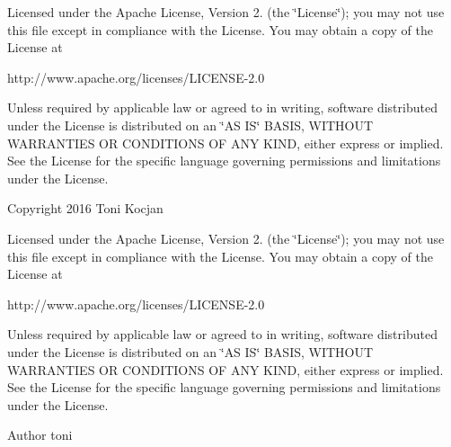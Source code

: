 Licensed under the Apache License, Version 2. (the \char`\"{}\+License\char`\"{}); you may not use this file except in compliance with the License. You may obtain a copy of the License at \begin{DoxyVerb}http://www.apache.org/licenses/LICENSE-2.0
\end{DoxyVerb}


Unless required by applicable law or agreed to in writing, software distributed under the License is distributed on an \char`\"{}\+A\+S I\+S\char`\"{} B\+A\+S\+IS, W\+I\+T\+H\+O\+UT W\+A\+R\+R\+A\+N\+T\+I\+ES OR C\+O\+N\+D\+I\+T\+I\+O\+NS OF A\+NY K\+I\+ND, either express or implied. See the License for the specific language governing permissions and limitations under the License.

Copyright 2016 Toni Kocjan

Licensed under the Apache License, Version 2. (the \char`\"{}\+License\char`\"{}); you may not use this file except in compliance with the License. You may obtain a copy of the License at \begin{DoxyVerb}http://www.apache.org/licenses/LICENSE-2.0
\end{DoxyVerb}


Unless required by applicable law or agreed to in writing, software distributed under the License is distributed on an \char`\"{}\+A\+S I\+S\char`\"{} B\+A\+S\+IS, W\+I\+T\+H\+O\+UT W\+A\+R\+R\+A\+N\+T\+I\+ES OR C\+O\+N\+D\+I\+T\+I\+O\+NS OF A\+NY K\+I\+ND, either express or implied. See the License for the specific language governing permissions and limitations under the License. \begin{DoxyAuthor}{Author}
toni 
\end{DoxyAuthor}
